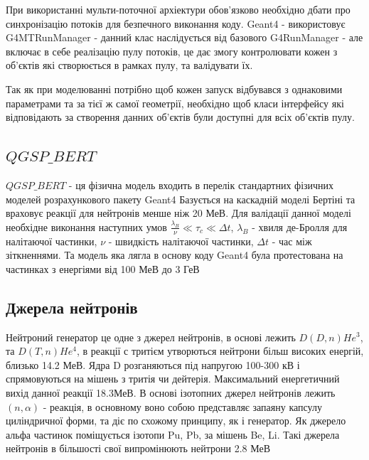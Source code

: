 \documentclass[a4paper, 14pt]{article}
\numberwithin{equation}{section}
\numberwithin{table}{section}
\begin{document}
При використанні мульти-поточної архіектури обов'язково необхідно дбати про синхронізацію потоків для безпечного виконання коду. Geant4 - використовує G4MTRunManager - данний клас наслідується від базового G4RunManager - але включає в себе реалізацію пулу потоків, це дає змогу контролювати кожен з об'єктів які створюється в рамках пулу, та валідувати їх. 

Так як при моделюванні потрібно щоб кожен запуск відбувався з однаковими параметрами та за тієї ж самої геометрії, необхідно щоб класи інтерфейсу які відповідають за створення данних об'єктів були доступні для всіх об'єктів пулу.

\subsection{$QGSP\_BERT$}
	$QGSP\_BERT$ - ця фізична модель входить в перелік стандартних фізичних моделей розрахункового пакету Geant4
	Базується на каскадній моделі Бертіні та враховує реакції для нейтронів менше ніж 20 МеВ. Для валідації данної моделі необхідне виконання наступних умов $\frac{\lambda_B}{\nu} \ll \tau_c \ll \Delta{t}$, $\lambda_B$ - хвиля де-Бролля для налітаючої частинки, $\nu$ - швидкість налітаючої частинки, $\Delta{t}$ - час між зіткненнями. Та модель яка лягла в основу коду Geant4 була протестована на частинках з енергіями від 100 МеВ до 3 ГеВ
\subsection{Джерела нейтронів}
	Нейтроний генератор це одне з джерел нейтронів, в основі лежить $D(D,n)He^3 $, та $D(T, n)He^4$, в реакції с тритієм утворються нейтрони більш високих енергій, близько 14.2 МеВ. Ядра D розганяються під напругою 100-300 кВ і спрямовуються на мішень з тритія чи дейтерія. Максимальний енергетичний вихід данної реакції 18.3МеВ. 
	В основі ізотопних джерел нейтронів лежить $(n,\alpha)$ - реакція, в основному воно собою представляє запаяну капсулу циліндричної форми, та діє по схожому принципу, як і генератор. Як джерело альфа частинок поміщується ізотопи Pu, Pb, за мішень Be, Li. Такі джерела нейтронів в більшості свої випромінюють нейтрони 2.8 МеВ

\newpage
\end{document}
